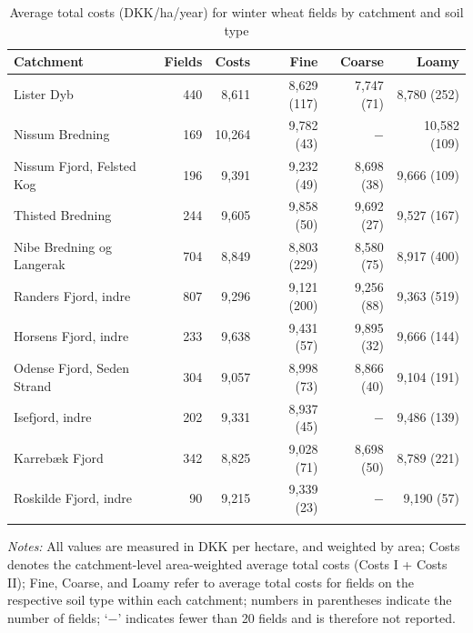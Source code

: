 \documentclass[12pt]{article}
\begin{document}
\begin{table}[H]
\centering
\small
\caption{Average total costs (DKK/ha/year) for winter wheat fields by catchment and soil type}
\label{tab:costs-vinterhvede}
\begin{threeparttable}
\begin{tabular}{lrrrrr}
\toprule
\textbf{Catchment} & \textbf{Fields} & \textbf{Costs} & \textbf{Fine} &
\textbf{Coarse} & \textbf{Loamy} \\
\midrule\addlinespace
Lister Dyb                 & 440 & 8,611  & 8,629 (117)  & 7,747 (71)   & 8,780 (252) \\
Nissum Bredning            & 169 & 10,264 & 9,782 (43)   & $-$           & 10,582 (109) \\
Nissum Fjord, Felsted Kog  & 196 & 9,391  & 9,232 (49)   & 8,698 (38)   & 9,666 (109) \\
Thisted Bredning           & 244 & 9,605  & 9,858 (50)   & 9,692 (27)   & 9,527 (167) \\
Nibe Bredning og Langerak  & 704 & 8,849  & 8,803 (229)  & 8,580 (75)   & 8,917 (400) \\
Randers Fjord, indre       & 807 & 9,296  & 9,121 (200)  & 9,256 (88)   & 9,363 (519) \\
Horsens Fjord, indre       & 233 & 9,638  & 9,431 (57)   & 9,895 (32)   & 9,666 (144) \\
Odense Fjord, Seden Strand & 304 & 9,057  & 8,998 (73)   & 8,866 (40)   & 9,104 (191) \\
Isefjord, indre            & 202 & 9,331  & 8,937 (45)   & $-$           & 9,486 (139) \\
Karrebæk Fjord             & 342 & 8,825  & 9,028 (71)   & 8,698 (50)   & 8,789 (221) \\
Roskilde Fjord, indre      &  90 & 9,215  & 9,339 (23)   & $-$           & 9,190 (57) \\
\addlinespace\bottomrule
\end{tabular}
\begin{tablenotes}
\footnotesize
\item \textit{Notes:} All values are measured in DKK per hectare, and weighted by area;
Costs denotes the catchment-level area-weighted average total costs (Costs I + Costs II);
Fine, Coarse, and Loamy refer to average total costs for fields on the respective
soil type within each catchment; numbers in parentheses indicate the number of
fields; `$-$' indicates fewer than 20 fields and is therefore not reported.
\end{tablenotes}
\end{threeparttable}
\end{table}
\end{document}
